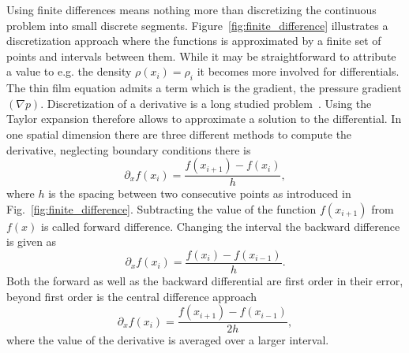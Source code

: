 Using finite differences means nothing more than discretizing the continuous problem into small discrete segments.
Figure~\ref{fig:finite_difference} illustrates a discretization approach where the functions is approximated by a finite set of points and intervals between them.
While it may be straightforward to attribute a value to e.g. the density $\rho(x_i) = \rho_i$ it becomes more involved for differentials.
The thin film equation admits a term which is the gradient, the pressure gradient $(\nabla p)$.
Discretization of a derivative is a long studied problem~\cite{boole1872treatise, jordan1965calculus}.
Using the Taylor expansion therefore allows to approximate a solution to the differential.
In one spatial dimension there are three different methods to compute the derivative, neglecting boundary conditions there is
\begin{equation}\label{eq:forward_dif}
    \partial_x f(x_i) = \frac{f(x_{i+1}) - f(x_i)}{h},
\end{equation}
where $h$ is the spacing between two consecutive points as introduced in Fig.~\ref{fig:finite_difference}. 
Subtracting the value of the function $f(x_{i+1})$ from $f(x)$ is called forward difference.
Changing the interval the backward difference is given as
\begin{equation}\label{eq:backward_dif}
    \partial_x f(x_i) = \frac{ f(x_i) - f(x_{i-1})}{h}.
\end{equation}
Both the forward as well as the backward differential are first order in their error, beyond first order is the central difference approach
\begin{equation}\label{eq:center_diff}
    \partial_x f(x_i) = \frac{ f(x_{i+1}) - f(x_{i-1})}{2h},
\end{equation}
where the value of the derivative is averaged over a larger interval. 

